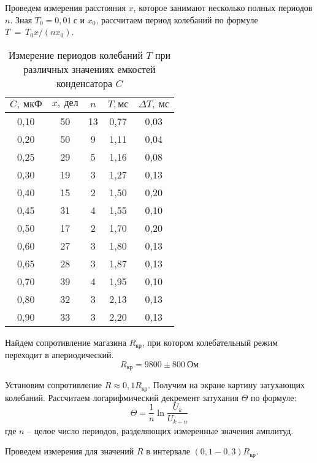 Проведем измерения расстояния $x$,
которое занимают несколько полных
периодов $n$. Зная $T_0 = 0,01\
\text{с}$ и $x_0$, рассчитаем период
колебаний по формуле $T~ =~ T_0x/(nx_0)$.
\renewcommand{\arraystretch}{1.1} 
\begin{table}[H]
\begin{tabular}{|c|c|c|c|c|}
\hline
$C, \ \text{мкФ}$    & $x, \ \text{дел}$
& $n$  & $T, \text{мс}$    & $\Delta T,
\ \text{мс}$   \\ \hline
0,10  & 50 & 13 & 0,77 & 0,03 \\ \hline
0,20  & 50 & 9  & 1,11 & 0,04 \\ \hline
0,25 & 29 & 5  & 1,16 & 0,08 \\ \hline
0,30  & 19 & 3  & 1,27 & 0,13 \\ \hline
0,40  & 15 & 2  & 1,50 & 0,20 \\ \hline
0,45 & 31 & 4  & 1,55 & 0,10 \\ \hline
0,50  & 17 & 2  & 1,70 & 0,20 \\ \hline
0,60  & 27 & 3  & 1,80 & 0,13 \\ \hline
0,65 & 28 & 3  & 1,87 & 0,13 \\ \hline
0,70  & 39 & 4  & 1,95 & 0,10 \\ \hline
0,80  & 32 & 3  & 2,13 & 0,13 \\ \hline
0,90  & 33 & 3  & 2,20 & 0,13 \\ \hline
\end{tabular}
\captionsetup{justification=centering}
\caption{Измерение периодов колебаний
$T$ при различных значениях емкостей
конденсатора $C$}
\end{table}

Найдем сопротивление магазина
$R_\text{кр}$, при котором колебательный
режим переходит в апериодический.
\[
    R_\text{кр} = 9800 \pm 800 \
    \text{Ом}
\]

Установим сопротивление $R \approx
0,1R_\text{кр}$. Получим на экране
картину затухающих колебаний. Рассчитаем
логарифмический декремент затухания
$\Theta$ по формуле:
\[
    \Theta =
    \frac{1}{n}\ln\frac{U_k}{U_{k+n}}
\]
где $n$ -- целое число периодов,
разделяющих измеренные значения амплитуд.

Проведем измерения для значений $R$ в
интервале $(0,1 - 0,3)R_\text{кр}$.

